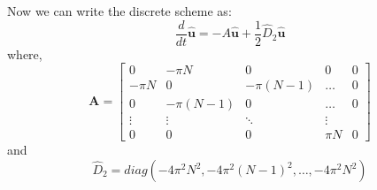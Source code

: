 \documentclass[12pt, fullpage,letterpaper]{article}
\begin{document}
Now we can write the discrete scheme as:
\begin{equation}
    \frac{d}{dt} \hat{\mathbf{u}} = - A\hat{\mathbf{u}} + \frac{1}{2} \hat{D}_2 \hat{\mathbf{u}}
\end{equation}
where,
\begin{equation}
\mathbf{A}=
\begin{bmatrix}
0 & -\pi N &0 & 0 & 0 \\
-\pi N & 0 & -\pi (N-1) &\hdots & 0 \\
0 & -\pi (N-1) &0  &\hdots & 0 \\

\vdots &  \vdots  & \ddots & \vdots \\
0 & 0 & 0 & \pi N & 0
\end{bmatrix} 
\end{equation}
and
\begin{equation}
    \hat{D}_2 = diag(-4\pi^2N^2, -4\pi^2(N-1)^2, \dots,  -4\pi^2 N^2)
\end{equation}

\end{document}
